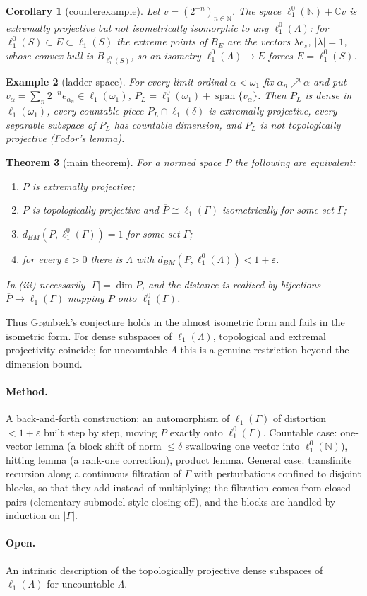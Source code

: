\documentclass[11pt]{article}
\newtheorem{theorem}{Theorem}
\newtheorem{corollary}[theorem]{Corollary}
\newtheorem{example}[theorem]{Example}
\theoremstyle{definition}
\newcommand{\lo}[1]{\ell_1^0(#1)}
\newcommand{\ellone}[1]{\ell_1(#1)}
\newcommand{\BM}{d_{BM}}
\begin{document}
\begin{corollary}[counterexample]
Let $v=(2^{-n})_{n\in\mathbb N}$. The space $\lo{\mathbb N}+\mathbb C v$ is
extremally projective but not isometrically isomorphic to any $\lo\Lambda$:
for $\lo S\subset E\subset\ellone S$ the extreme points of $B_E$ are the
vectors $\lambda e_s$, $|\lambda|=1$, whose convex hull is $B_{\lo S}$, so an
isometry $\lo\Lambda\to E$ forces $E=\lo S$.
\end{corollary}

\begin{example}[ladder space]
For every limit ordinal $\alpha<\omega_1$ fix $\alpha_n\nearrow\alpha$ and put
$v_\alpha=\sum_n2^{-n}e_{\alpha_n}\in\ellone{\omega_1}$,
$P_L=\lo{\omega_1}+\operatorname{span}\{v_\alpha\}$. Then $P_L$ is dense in
$\ellone{\omega_1}$, every countable piece $P_L\cap\ellone\delta$ is extremally
projective, every separable subspace of $P_L$ has countable dimension, and
$P_L$ is not topologically projective (Fodor's lemma).
\end{example}

\begin{theorem}[main theorem]
For a normed space $P$ the following are equivalent:
\begin{enumerate}
  \item[(i)] $P$ is extremally projective;
  \item[(ii)] $P$ is topologically projective and $\overline P\cong\ellone\Gamma$
    isometrically for some set $\Gamma$;
  \item[(iii)] $\BM(P,\lo\Gamma)=1$ for some set $\Gamma$;
  \item[(iv)] for every $\varepsilon>0$ there is $\Lambda$ with
    $\BM(P,\lo\Lambda)<1+\varepsilon$.
\end{enumerate}
In (iii) necessarily $|\Gamma|=\dim P$, and the distance is realized by
bijections $\overline P\to\ellone\Gamma$ mapping $P$ onto $\lo\Gamma$.
\end{theorem}

\noindent Thus Gr{\o}nb{\ae}k's conjecture holds in the almost isometric form
and fails in the isometric form. For dense subspaces of $\ellone\Lambda$,
topological and extremal projectivity coincide; for uncountable $\Lambda$ this
is a genuine restriction beyond the dimension bound.

\paragraph{Method.} A back-and-forth construction: an automorphism of
$\ellone\Gamma$ of distortion $<1+\varepsilon$ built step by step, moving $P$
exactly onto $\lo\Gamma$. Countable case: one-vector lemma (a block shift of
norm $\le\delta$ swallowing one vector into $\lo{\mathbb N}$), hitting lemma
(a rank-one correction), product lemma. General case: transfinite recursion
along a continuous filtration of $\Gamma$ with perturbations confined to
disjoint blocks, so that they add instead of multiplying; the filtration
comes from closed pairs (elementary-submodel style closing off), and the
blocks are handled by induction on $|\Gamma|$.

\paragraph{Open.} An intrinsic description of the topologically projective
dense subspaces of $\ellone\Lambda$ for uncountable $\Lambda$.
\end{document}
